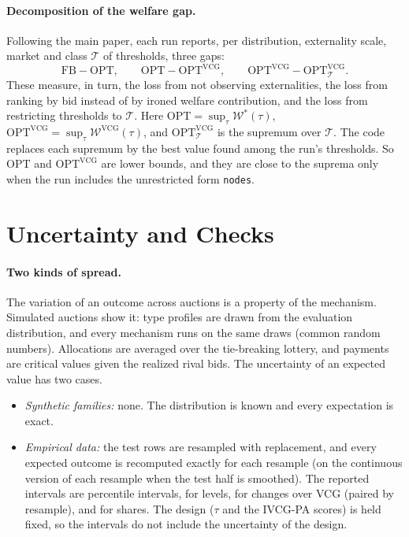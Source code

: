 \documentclass[11pt]{article}
\newcommand{\W}{\mathcal{W}}
\newcommand{\code}[1]{\texttt{#1}}
\begin{document}
\paragraph{Decomposition of the welfare gap.} Following the main paper, each run reports, per distribution, externality scale, market and class $\mathcal T$ of thresholds, three gaps:
\[
\mathrm{FB}-\mathrm{OPT},\qquad \mathrm{OPT}-\mathrm{OPT}^{\mathrm{VCG}},\qquad \mathrm{OPT}^{\mathrm{VCG}}-\mathrm{OPT}^{\mathrm{VCG}}_{\mathcal T}.
\]
These measure, in turn, the loss from not observing externalities, the loss from ranking by bid instead of by ironed welfare contribution, and the loss from restricting thresholds to $\mathcal T$. Here $\mathrm{OPT}=\sup_\tau\W^*(\tau)$, $\mathrm{OPT}^{\mathrm{VCG}}=\sup_\tau\W^{\mathrm{VCG}}(\tau)$, and $\mathrm{OPT}^{\mathrm{VCG}}_{\mathcal T}$ is the supremum over $\mathcal T$. The code replaces each supremum by the best value found among the run's thresholds. So $\mathrm{OPT}$ and $\mathrm{OPT}^{\mathrm{VCG}}$ are lower bounds, and they are close to the suprema only when the run includes the unrestricted form \code{nodes}.

\section{Uncertainty and Checks}\label{sec:uncertainty}

\paragraph{Two kinds of spread.} The variation of an outcome across auctions is a property of the mechanism. Simulated auctions show it: type profiles are drawn from the evaluation distribution, and every mechanism runs on the same draws (common random numbers). Allocations are averaged over the tie-breaking lottery, and payments are critical values given the realized rival bids. The uncertainty of an expected value has two cases.
\begin{itemize}
    \item \emph{Synthetic families:} none. The distribution is known and every expectation is exact.
    \item \emph{Empirical data:} the test rows are resampled with replacement, and every expected outcome is recomputed exactly for each resample (on the continuous version of each resample when the test half is smoothed). The reported intervals are percentile intervals, for levels, for changes over VCG (paired by resample), and for shares. The design ($\tau$ and the IVCG-PA scores) is held fixed, so the intervals do not include the uncertainty of the design.
\end{itemize}
\end{document}
